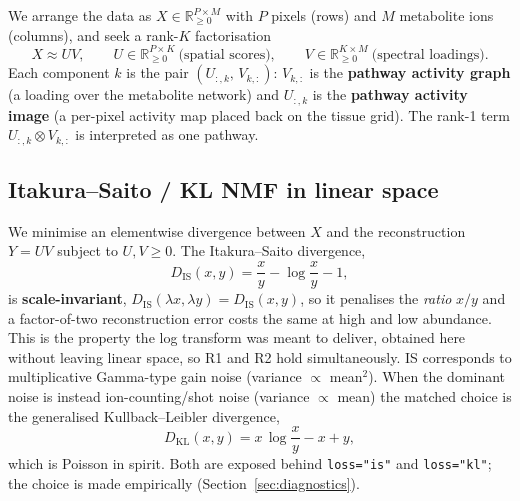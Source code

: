 \documentclass[11pt]{article}
\newcommand{\R}{\mathbb{R}}
\newcommand{\Rnn}{\R_{\ge 0}}
\newcommand{\DIS}{D_{\mathrm{IS}}}
\newcommand{\DKL}{D_{\mathrm{KL}}}
\newcommand{\code}[1]{\texttt{#1}}
\begin{document}
We arrange the data as $X \in \Rnn^{P\times M}$ with $P$ pixels (rows) and $M$ metabolite
ions (columns), and seek a rank-$K$ factorisation
\begin{equation}
  X \approx U V, \qquad U \in \Rnn^{P\times K}\ \text{(spatial scores)}, \qquad
  V \in \Rnn^{K\times M}\ \text{(spectral loadings)}.
\end{equation}
Each component $k$ is the pair $(U_{:,k},\,V_{k,:})$: $V_{k,:}$ is the \textbf{pathway
activity graph} (a loading over the metabolite network) and $U_{:,k}$ is the \textbf{pathway
activity image} (a per-pixel activity map placed back on the tissue grid). The rank-1 term
$U_{:,k} \otimes V_{k,:}$ is interpreted as one pathway.

\subsection{Itakura--Saito / KL NMF in linear space}
\label{sec:route2}

We minimise an elementwise divergence between $X$ and the reconstruction $Y = UV$ subject to
$U, V \ge 0$. The Itakura--Saito divergence,
\begin{equation}
  \DIS(x, y) = \frac{x}{y} - \log\frac{x}{y} - 1,
\end{equation}
is \textbf{scale-invariant}, $\DIS(\lambda x, \lambda y) = \DIS(x, y)$, so it penalises the
\emph{ratio} $x/y$ and a factor-of-two reconstruction error costs the same at high and low
abundance. This is the property the log transform was meant to deliver, obtained here
without leaving linear space, so R1 and R2 hold simultaneously. IS corresponds to
multiplicative Gamma-type gain noise (variance $\propto$ mean$^2$). When the dominant noise
is instead ion-counting/shot noise (variance $\propto$ mean) the matched choice is the
generalised Kullback--Leibler divergence,
\begin{equation}
  \DKL(x, y) = x\,\log\frac{x}{y} - x + y,
\end{equation}
which is Poisson in spirit. Both are exposed behind \code{loss="is"} and \code{loss="kl"};
the choice is made empirically (Section~\ref{sec:diagnostics}).
\end{document}
